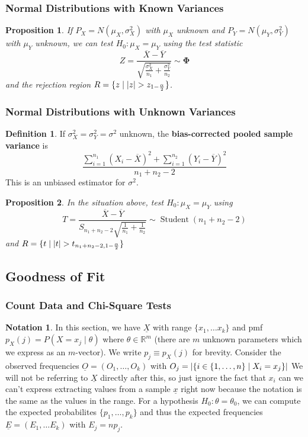 \documentclass[12pt]{article}
\newtheorem*{prop*}{Proposition}
\theoremstyle{definition}
\newtheorem*{defn*}{Definition}
\newtheorem*{not*}{Notation}
\DeclarePairedDelimiter\abs{\lvert}{\rvert}
\newcommand{\R}{\mathbb{R}}
\newcommand{\stdnorm}{\mathbf{\Phi}}
\DeclareMathOperator{\Student}{Student}
\begin{document}
\subsubsection{Normal Distributions with Known Variances}

\begin{prop*}
  If $P_X = N(\mu_X, \sigma^2_X)$ with $\mu_X$ unknown and $P_Y = N(\mu_Y, \sigma^2_Y)$ with $\mu_Y$ unknown, we can test $H_0 : \mu_X = \mu_Y$ using the test statistic
  $$Z = \frac{\overline{X} - \overline{Y}}{\sqrt{\frac{\sigma^2_X}{n_1} + \frac{\sigma^2_Y}{n_2}}} \sim \stdnorm$$
  and the rejection region $R = \{z \mid \abs{z} > z_{1 - \frac{\alpha}{2}}\}$.
\end{prop*}

\subsubsection{Normal Distributions with Unknown Variances}

\begin{defn*}
  If $\sigma^2_X = \sigma^2_Y = \sigma^2$ unknown, the \textbf{bias-corrected pooled sample variance} is
  $$\frac{\sum_{i = 1}^{n_1}(X_i - \overline{X})^2 + \sum_{i = 1}^{n_2}(Y_i - \overline{Y})^2}{n_1 + n_2 - 2}$$
  This is an unbiased estimator for $\sigma^2$.
\end{defn*}

\begin{prop*}
  In the situation above, test $H_0 : \mu_X = \mu_Y$ using
  $$T = \frac{\overline{X} - \overline{Y}}{S_{n_1 + n_2 - 2}\sqrt{\frac{1}{n_1} + \frac{1}{n_2}}} \sim \Student(n_1 + n_2 - 2)$$
  and $R = \{t \mid \abs{t} > t_{n_1 + n_2 - 2, 1 - \frac{\alpha}{2}}\}$
\end{prop*}

\subsection{Goodness of Fit}

\subsubsection{Count Data and Chi-Square Tests}

\begin{not*}
  In this section, we have $\underline{X}$ with range $\{x_1, \ldots x_k\}$ and pmf $p_X(j) = P(X = x_j \mid \theta)$ where $\theta \in \R^m$ (there are $m$ unknown parameters which we express as an $m$-vector).
  We write $p_j \equiv p_X(j)$ for brevity.
  Consider the observed frequencies $\underline{O} = (O_1, \ldots, O_k)$ with $O_j = \abs{\{i \in \{1, \ldots, n\} \mid X_i = x_j\}}$
  We will not be referring to $\underline{X}$ directly after this, so just ignore the fact that $x_i$ can we can't express extracting values from a sample $\underline{x}$ right now because the notation is the same as the values in the range.
  For a hypothesis $H_0 : \theta = \theta_0$, we can compute the expected probabilites $\{p_1, \ldots, p_k\}$ and thus the expected frequencies $\underline{E} = (E_1, \ldots E_k)$ with $E_j = np_j$.
\end{not*}
\end{document}
